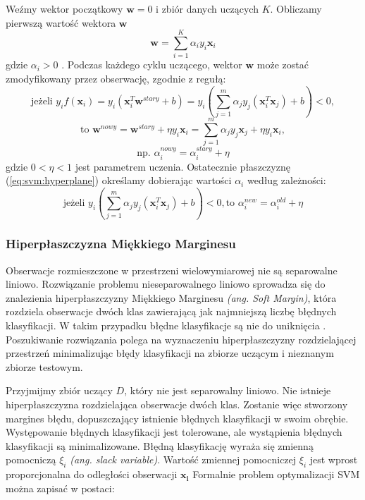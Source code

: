 \documentclass[a4paper,12pt,twoside,openany]{report}
\newcommand{\ang}[1]{\textit{(ang. #1)}}
\newcommand{\Eq}[1]{(\ref{#1})}
\renewcommand{\vec}[1]{\bm{#1}}
\begin{document}
Weźmy wektor początkowy $\vec{w} = 0$ i zbiór danych uczących $K$.
Obliczamy pierwszą wartość wektora $\vec{w}$
\begin{equation}\label{eq:svm:hyperplane}
	{\vec{w}}=\sum_{i=1}^K \alpha_i y_i {\vec{x}}_i
\end{equation}
gdzie $\alpha_i>0$ \cite{Mittal2016}.
Podczas każdego cyklu uczącego, wektor $\vec{w}$ może zostać zmodyfikowany przez obserwację, 
zgodnie z regułą:
\begin{equation}
	\mbox{jeżeli } y_i f({\vec{x}}_i)=y_i ({\vec{x}}_i^T{\vec{w}}^{stary}+b)
	=y_i\left(\sum_{j=1}^m \alpha_j y_j({\vec{x}}_i^T{\vec{x}}_j)+b\right)<0,
\end{equation}
\begin{equation}
	\mbox{to } {\vec{w}}^{nowy}={\vec{w}}^{stary}+\eta y_i {\vec{x}}_i
	=\sum_{j=1}^{m} \alpha_j y_j\vec{x}_j +\eta y_i {\vec{x}}_i,
\end{equation}
\begin{equation}
	\mbox{np. }
	\alpha_i^{nowy}=\alpha_i^{stary}+\eta
\end{equation}
gdzie $0 < \eta < 1$ jest parametrem uczenia.
Ostatecznie płaszczyznę \Eq{eq:svm:hyperplane} określamy dobierając wartości $\alpha_i$ według zależności: 
\begin{equation}
	\mbox{jeżeli } y_i\left(\sum_{j=1}^m \alpha_j y_j({\vec{x}}_i^T\vec{x}_j)+b\right)<0,
	\mbox{to } \alpha_i^{new}=\alpha_i^{old}+\eta 
\end{equation}

\subsubsection{Hiperpłaszczyzna Miękkiego Marginesu}
Obserwacje rozmieszczone w przestrzeni wielowymiarowej nie są separowalne liniowo. 
Rozwiązanie problemu nieseparowalnego liniowo sprowadza się do znalezienia hiperpłaszczyzny Miękkiego Marginesu \ang{Soft Margin}, 
która rozdziela obserwacje dwóch klas zawierającą jak najmniejszą liczbę błędnych klasyfikacji.
W takim przypadku błędne klasyfikacje są nie do uniknięcia \cite{Dellepiane2015}.
Poszukiwanie rozwiązania polega na wyznaczeniu hiperpłaszczyzny rozdzielającej przestrzeń 
minimalizując błędy klasyfikacji na zbiorze uczącym i nieznanym zbiorze testowym.

Przyjmijmy zbiór uczący $D$, który nie jest separowalny liniowo. 
Nie istnieje hiperpłaszczyzna rozdzielająca obserwacje dwóch klas.
Zostanie więc stworzony margines błędu, dopuszczający istnienie błędnych klasyfikacji w swoim obrębie.
Występowanie błędnych klasyfikacji jest tolerowane, ale wystąpienia błędnych klasyfikacji są minimalizowane.
Błędną klasyfikację wyraża się zmienną pomocniczą $\xi_i$ \ang{slack variable}. 
Wartość zmiennej pomocniczej $\xi_i$ jest wprost proporcjonalna do odległości obserwacji $\vec{x_i}$
Formalnie problem optymalizacji SVM można zapisać w postaci:
\end{document}
